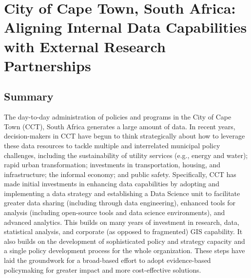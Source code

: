 \hypertarget{cct}{%
\chapter{City of Cape Town, South Africa: Aligning Internal Data Capabilities with External Research Partnerships}\label{cct}}

\hrulefill

\hypertarget{summary-6}{%
\section{Summary}\label{summary-6}}

The day-to-day administration of policies and programs in the City of Cape Town (CCT), South Africa generates a large amount of data. In recent years, decision-makers in CCT have begun to think strategically about how to leverage these data resources to tackle multiple and interrelated municipal policy challenges, including the sustainability of utility services (e.g., energy and water); rapid urban transformation; investments in transportation, housing, and infrastructure; the informal economy; and public safety. Specifically, CCT has made initial investments in enhancing data capabilities by adopting and implementing a data strategy and establishing a Data Science unit to facilitate greater data sharing (including through data engineering), enhanced tools for analysis (including open-source tools and data science environments), and advanced analytics. This builds on many years of investment in research, data, statistical analysis, and corporate (as opposed to fragmented) GIS capability. It also builds on the development of sophisticated policy and strategy capacity and a single policy development process for the whole organization. These steps have laid the groundwork for a broad-based effort to adopt evidence-based policymaking for greater impact and more cost-effective solutions.

